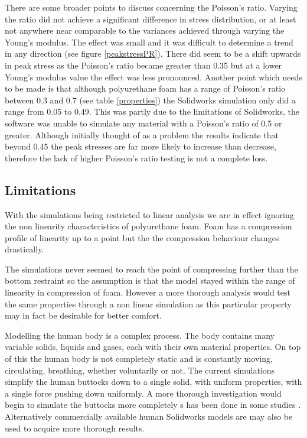 \documentclass[conference]{IEEEtran}
\begin{document}
There are some broader points to discuss concerning the Poisson's ratio. Varying the ratio did not achieve a significant difference in stress distribution, or at least not anywhere near comparable to the variances achieved through varying the Young's modulus. The effect was small and it was difficult to determine a trend in any direction (see figure \ref{peakstressPR}). There did seem to be a shift upwards in peak stress as the Poisson's ratio became greater than 0.35 but at a lower Young's modulus value the effect was less pronounced. Another point which needs to be made is that although polyurethane foam has a range of Poisson's ratio between 0.3 and 0.7 (see table \ref{properties}) the Solidworks simulation only did a range from 0.05 to 0.49. This was partly due to the limitations of Solidworks, the software was unable to simulate any material with a Poisson's ratio of 0.5 or greater. Although initially thought of as a problem the results indicate that beyond 0.45 the peak stresses are far more likely to increase than decrease, therefore the lack of higher Poisson's ratio testing is not a complete loss. 



    \subsection{Limitations}
    With the simulations being restricted to linear analysis we are in effect ignoring the non linearity characteristics of polyurethane foam. Foam has a compression profile of linearity up to a point but the the compression behaviour changes drastically. 
    
  
    The simulations never seemed to reach the point of compressing further than the bottom restraint so the assumption is that the model stayed within the range of linearity in compression of foam. However a more thorough analysis would test the same properties through a non linear simulation as this particular property may in fact be desirable for better comfort.

    Modelling the human body is a complex process. The body contains many variable solids, liquids and gases, each with their own material properties. On top of this the human body is not completely static and is constantly moving, circulating, breathing, whether voluntarily or not. The current simulations simplify the human buttocks down to a single solid, with uniform properties, with a single force pushing down uniformly. A more thorough investigation would begin to simulate the buttocks more completely s has been done in some studies \cite{Shu2009}. Alternatively commercially available human Solidworks models are may also be used to acquire more thorough results.
    
\end{document}
